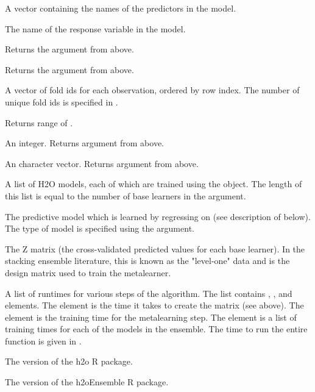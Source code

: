 \documentclass[a4paper]{book}
\begin{document}
\begin{Value}

\begin{ldescription}
\item[\code{x}] 
A vector containing the names of the predictors in the model.

\item[\code{y}] 
The name of the response variable in the model.

\item[\code{family}] 
Returns the  argument from above.  

\item[\code{cvControl}] 
Returns the  argument from above.

\item[\code{folds}] 
A vector of fold ids for each observation, ordered by row index.  The number of unique fold ids is specified in .   

\item[\code{ylim}] 
Returns range of .

\item[\code{seed}] 
An integer. Returns  argument from above.

\item[\code{parallel}] 
An character vector. Returns  argument from above.

\item[\code{basefits}] 
A list of H2O models, each of which are trained using the  object.  The length of this list is equal to the number of base learners in the  argument.

\item[\code{metafit}] 
The predictive model which is learned by regressing  on  (see description of  below).  The type of model is specified using the  argument.

\item[\code{Z}] 
The Z matrix (the cross-validated predicted values for each base learner).  In the stacking ensemble literature, this is known as the "level-one" data and is the design matrix used to train the metalearner.

\item[\code{runtime}] 
A list of runtimes for various steps of the algorithm.  The list contains , ,  and  elements.  The  element is the time it takes to create the  matrix (see above).  The  element is the training time for the metalearning step.  The  element is a list of training times for each of the models in the ensemble.  The time to run the entire  function is given in .

\item[\code{h2o\_version}] 
The version of the h2o R package.

\item[\code{h2oEnsemble\_version}] 
The version of the h2oEnsemble R package.

\end{ldescription}
\end{Value}
\end{document}
